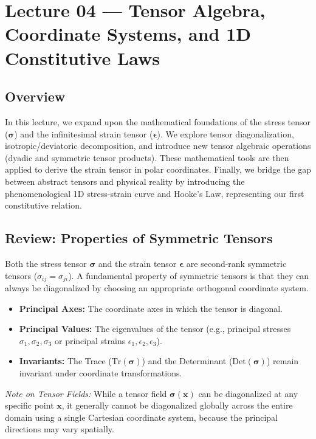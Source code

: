 

\section{Lecture 04 — Tensor Algebra, Coordinate Systems, and 1D Constitutive Laws}\label{sec:lec04:tensor_algebra}
\date{April 15 2026}
\subsection*{Overview}
In this lecture, we expand upon the mathematical foundations of the stress tensor ($\mathbf{\sigma}$) and the infinitesimal strain tensor ($\boldsymbol{\epsilon}$). We explore tensor diagonalization, isotropic/deviatoric decomposition, and introduce new tensor algebraic operations (dyadic and symmetric tensor products). These mathematical tools are then applied to derive the strain tensor in polar coordinates. Finally, we bridge the gap between abstract tensors and physical reality by introducing the phenomenological 1D stress-strain curve and Hooke's Law, representing our first constitutive relation.

\subsection*{Review: Properties of Symmetric Tensors}
Both the stress tensor $\mathbf{\sigma}$ and the strain tensor $\boldsymbol{\epsilon}$ are second-rank symmetric tensors ($\sigma_{ij} = \sigma_{ji}$). A fundamental property of symmetric tensors is that they can always be diagonalized by choosing an appropriate orthogonal coordinate system.

\begin{itemize}
    \item \textbf{Principal Axes:} The coordinate axes in which the tensor is diagonal.
    \item \textbf{Principal Values:} The eigenvalues of the tensor (e.g., principal stresses $\sigma_1, \sigma_2, \sigma_3$ or principal strains $\epsilon_1, \epsilon_2, \epsilon_3$).
    \item \textbf{Invariants:} The Trace ($\text{Tr}(\mathbf{\sigma})$) and the Determinant ($\text{Det}(\mathbf{\sigma})$) remain invariant under coordinate transformations.
\end{itemize}

\textit{Note on Tensor Fields:} While a tensor field $\mathbf{\sigma}(\mathbf{x})$ can be diagonalized at any specific point $\mathbf{x}$, it generally cannot be diagonalized globally across the entire domain using a single Cartesian coordinate system, because the principal directions may vary spatially.

